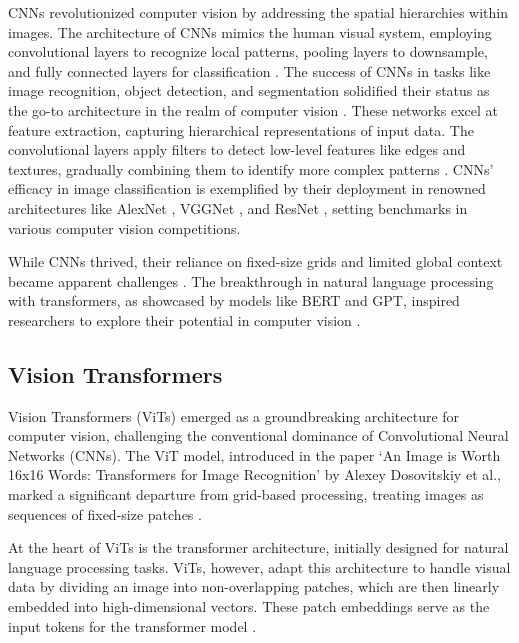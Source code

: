 CNNs revolutionized computer vision by addressing the spatial hierarchies within images. The architecture of CNNs mimics the human visual system, employing convolutional layers to recognize local patterns, pooling layers to downsample, and fully connected layers for classification \cite{lindsay2021convolutional}. The success of CNNs in tasks like image recognition, object detection, and segmentation solidified their status as the go-to architecture in the realm of computer vision \cite{bhatt2021cnn}. These networks excel at feature extraction, capturing hierarchical representations of input data. The convolutional layers apply filters to detect low-level features like edges and textures, gradually combining them to identify more complex patterns \cite{bhatt2021cnn}. CNNs' efficacy in image classification is exemplified by their deployment in renowned architectures like AlexNet \cite{alom2018history}, VGGNet \cite{majib2021vgg}, and ResNet \cite{targ2016resnet}, setting benchmarks in various computer vision competitions.

While CNNs thrived, their reliance on fixed-size grids and limited global context became apparent challenges \cite{Ahmed_Alam2023}. The breakthrough in natural language processing with transformers, as showcased by models like BERT and GPT, inspired researchers to explore their potential in computer vision \cite{WANG2023100047}.

  \subsection{Vision Transformers} \label{ssec:s2}

Vision Transformers (ViTs) emerged as a groundbreaking architecture for computer vision, challenging the conventional dominance of Convolutional Neural Networks (CNNs). The ViT model, introduced in the paper `An Image is Worth 16x16 Words: Transformers for Image Recognition' by Alexey Dosovitskiy et al., marked a significant departure from grid-based processing, treating images as sequences of fixed-size patches \cite{dosovitskiy2021image}.

At the heart of ViTs is the transformer architecture, initially designed for natural language processing tasks. ViTs, however, adapt this architecture to handle visual data by dividing an image into non-overlapping patches, which are then linearly embedded into high-dimensional vectors. These patch embeddings serve as the input tokens for the transformer model \cite{ruan2022vision}.

